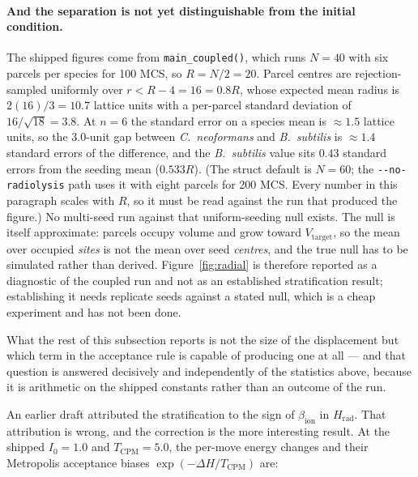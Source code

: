 \documentclass[11pt]{article}
\begin{document}
\paragraph{And the separation is not yet distinguishable from the initial condition.}
The shipped figures come from \texttt{main\_coupled()}, which runs $N = 40$ with six parcels per
species for 100 MCS, so $R = N/2 = 20$. Parcel centres are rejection-sampled uniformly over
$r < R - 4 = 16 = 0.8R$, whose expected mean radius is $2(16)/3 = 10.7$ lattice units with a
per-parcel standard deviation of $16/\sqrt{18} = 3.8$. At $n = 6$ the standard error on a species
mean is $\approx 1.5$ lattice units, so the 3.0-unit gap between \textit{C.~neoformans} and
\textit{B.~subtilis} is $\approx 1.4$ standard errors of the difference, and the
\textit{B.~subtilis} value sits $0.43$ standard errors from the seeding mean ($0.533R$).
(The struct default is $N = 60$; the \texttt{-{}-no-radiolysis} path uses it with eight parcels for
200 MCS. Every number in this paragraph scales with $R$, so it must be read against the run that
produced the figure.) No multi-seed run against that
uniform-seeding null exists. The null is itself approximate: parcels occupy volume and grow toward
$V_{\mathrm{target}}$, so the mean over occupied \emph{sites} is not the mean over seed
\emph{centres}, and the true null has to be simulated rather than derived. Figure~\ref{fig:radial}
is therefore reported as a diagnostic of the coupled run and not as an established stratification
result; establishing it needs replicate seeds against a stated null, which is a cheap experiment and
has not been done.

What the rest of this subsection reports is not the size of the displacement but which term in the
acceptance rule is capable of producing one at all --- and that question is answered decisively and
independently of the statistics above, because it is arithmetic on the shipped constants rather than
an outcome of the run.

An earlier draft attributed the stratification to the sign of $\beta_{\mathrm{ion}}$ in
$H_{\mathrm{rad}}$. That
attribution is wrong, and the correction is the more interesting result. At the shipped
$I_0 = 1.0$ and $T_{\mathrm{CPM}} = 5.0$, the per-move energy changes and their Metropolis
acceptance biases $\exp(-\Delta H / T_{\mathrm{CPM}})$ are:
\end{document}
